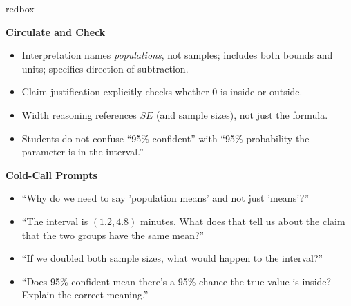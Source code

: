 \documentclass[10pt]{article}
\begin{document}
\begin{skillbox}{redbox}
\begin{minipage}[t]{0.48\linewidth}
    \textbf{Circulate and Check}
    \begin{itemize}
        \item Interpretation names \emph{populations}, not samples; includes both bounds
              and units; specifies direction of subtraction.
        \item Claim justification explicitly checks whether 0 is inside or outside.
        \item Width reasoning references $SE$ (and sample sizes), not just the formula.
        \item Students do not confuse ``95\% confident'' with ``95\% probability the
              parameter is in the interval.''
    \end{itemize}
\end{minipage}
\hfill
\begin{minipage}[t]{0.48\linewidth}
    \textbf{Cold-Call Prompts}
    \begin{itemize}
        \item ``Why do we need to say 'population means' and not just 'means'?''
        \item ``The interval is $(1.2, 4.8)$ minutes. What does that tell us about the
              claim that the two groups have the same mean?''
        \item ``If we doubled both sample sizes, what would happen to the interval?''
        \item ``Does 95\% confident mean there's a 95\% chance the true value is inside?
              Explain the correct meaning.''
    \end{itemize}
\end{minipage}
\end{skillbox}
\end{document}
